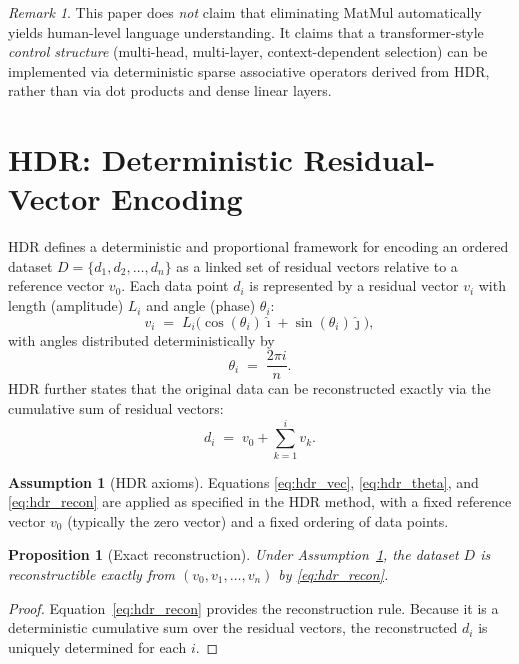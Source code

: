 \documentclass[11pt,a4paper]{article}
\theoremstyle{definition}
\newtheorem{assumption}{Assumption}[section]
\theoremstyle{plain}
\newtheorem{proposition}{Proposition}[section]
\theoremstyle{remark}
\newtheorem{remark}{Remark}[section]
\begin{document}
\begin{remark}
This paper does \emph{not} claim that eliminating MatMul automatically yields human-level language understanding.
It claims that a transformer-style \emph{control structure} (multi-head, multi-layer, context-dependent selection) can be implemented
via deterministic sparse associative operators derived from HDR, rather than via dot products and dense linear layers.
\end{remark}

\section{HDR: Deterministic Residual-Vector Encoding}
HDR defines a deterministic and proportional framework for encoding an ordered dataset
$D=\{d_1,d_2,\dots,d_n\}$ as a linked set of residual vectors relative to a reference vector $v_0$.
Each data point $d_i$ is represented by a residual vector $v_i$ with length (amplitude) $L_i$ and angle (phase) $\theta_i$:
\begin{equation}\label{eq:hdr_vec}
v_i \;=\; L_i\bigl(\cos(\theta_i)\hat{\imath} + \sin(\theta_i)\hat{\jmath}\bigr),
\end{equation}
with angles distributed deterministically by
\begin{equation}\label{eq:hdr_theta}
\theta_i \;=\; \frac{2\pi i}{n}.
\end{equation}
HDR further states that the original data can be reconstructed exactly via the cumulative sum of residual vectors:
\begin{equation}\label{eq:hdr_recon}
d_i \;=\; v_0 + \sum_{k=1}^{i} v_k.
\end{equation}

\begin{assumption}[HDR axioms]\label{ass:hdr}
Equations \eqref{eq:hdr_vec}, \eqref{eq:hdr_theta}, and \eqref{eq:hdr_recon} are applied as specified in the HDR method,
with a fixed reference vector $v_0$ (typically the zero vector) and a fixed ordering of data points.
\end{assumption}

\begin{proposition}[Exact reconstruction]\label{prop:hdr_exact}
Under Assumption~\ref{ass:hdr}, the dataset $D$ is reconstructible exactly from $(v_0,v_1,\dots,v_n)$ by \eqref{eq:hdr_recon}.
\end{proposition}
\begin{proof}
Equation~\eqref{eq:hdr_recon} provides the reconstruction rule. Because it is a deterministic cumulative sum over the residual vectors,
the reconstructed $d_i$ is uniquely determined for each $i$.
\end{proof}
\end{document}
